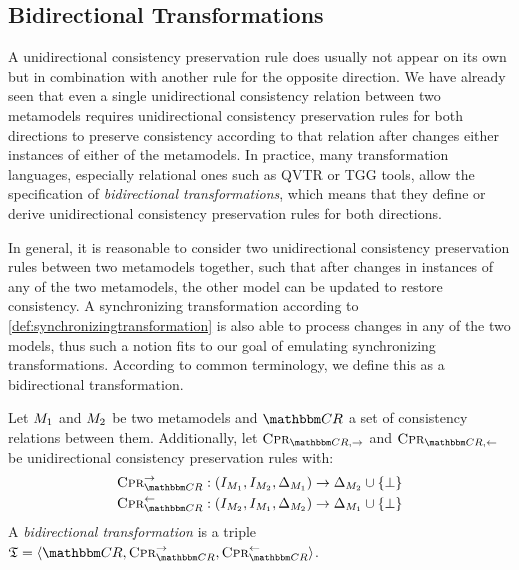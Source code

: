 \subsection{Bidirectional Transformations}

A unidirectional consistency preservation rule does usually not appear on its own but in combination with another rule for the opposite direction.
We have already seen that even a single unidirectional consistency relation between two metamodels requires unidirectional consistency preservation rules for both directions to preserve consistency according to that relation after changes either instances of either of the metamodels.
In practice, many transformation languages, especially relational ones such as \gls{QVTR} or \gls{TGG} tools, allow the specification of \emph{bidirectional transformations}, which means that they define or derive unidirectional consistency preservation rules for both directions.

In general, it is reasonable to consider two unidirectional consistency preservation rules between two metamodels together, such that after changes in instances of any of the two metamodels, the other model can be updated to restore consistency.
A synchronizing transformation according to \autoref{def:synchronizingtransformation} is also able to process changes in any of the two models, thus such a notion fits to our goal of emulating synchronizing transformations.
According to common terminology, we define this as a bidirectional transformation.

\begin{definition}
    \label{def:bidirectionaltransformation}
    Let $M_{1}$ and $M_{2}$ be two metamodels and $\consistencyrelationset{CR}$ a set of consistency relations between them.
    Additionally, let $\consistencypreservationrule{\consistencyrelationset{CR},{\rightarrow}}$ and $\consistencypreservationrule{\consistencyrelationset{CR},{\leftarrow}}$ be unidirectional consistency preservation rules with:
    \begin{align*}
        &
        \consistencypreservationrule{\consistencyrelationset{CR}}^{\rightarrow} : (\metamodelinstanceset{M}{1}, \metamodelinstanceset{M}{2}, \changeuniverse{\metamodel{M}{1}}) \rightarrow \changeuniverse{\metamodel{M}{2}} \cup \setted{\bot} \\
        &
        \consistencypreservationrule{\consistencyrelationset{CR}}^{\leftarrow} : (\metamodelinstanceset{M}{2}, \metamodelinstanceset{M}{1}, \changeuniverse{\metamodel{M}{2}}) \rightarrow \changeuniverse{\metamodel{M}{1}} \cup \setted{\bot}
    \end{align*}
    A \emph{bidirectional transformation} is a triple $\transformation{T} = \tupled{\consistencyrelationset{CR},\consistencypreservationrule{\consistencyrelationset{CR}}^{\rightarrow}, \consistencypreservationrule{\consistencyrelationset{CR}}^{\leftarrow}}$.
\end{definition}

